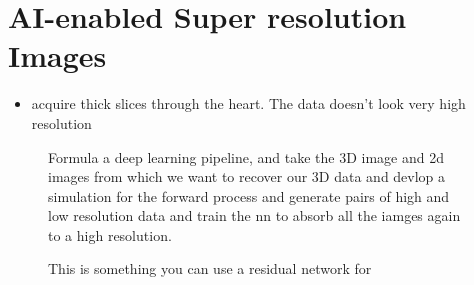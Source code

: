 \documentclass[11pt]{article}
\begin{document}
\section{AI-enabled Super resolution Images}

\begin{minipage}[l]{.5\linewidth}
    \begin{figure}[H]
        \centering
    \end{figure}    
\end{minipage}\hfill
\begin{minipage}[r]{.48\linewidth}
    \begin{itemize}
        \item acquire thick slices through the heart. The data doesn't look very high resolution
    \end{itemize}
\end{minipage}

\begin{figure}[H]
    \centering
    \caption*{Formula a deep learning pipeline, and take the 3D image and 2d images from which we want to recover our 3D data and devlop a simulation for the forward process and generate pairs of high and low resolution data and train the nn to absorb all the iamges again to a high resolution.}
\end{figure}   

\begin{figure}[H]
    \centering
    \caption*{This is something you can use a residual network for}
\end{figure}  

\end{document}
